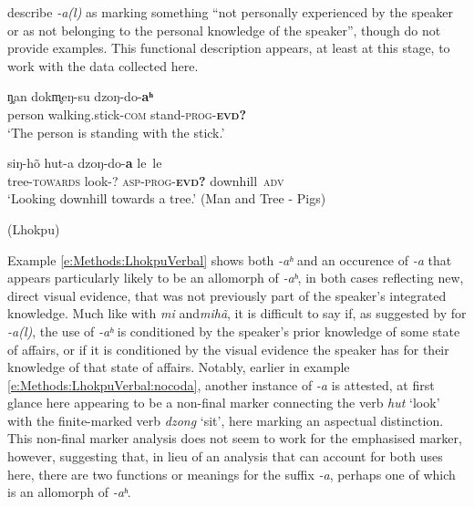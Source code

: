 \cite[20-21]{Grollmann2018} describe \textit{-a(l)} as marking something ``not personally experienced by the speaker or as not belonging to the personal knowledge of the speaker'', though do not provide examples. This functional description appears, at least at this stage, to work with the data collected here.

\begin{exe}
\ex\label{e:Methods:LhokpuVerbal}
\begin{xlist}
\ex \label{e:Methods:LhokpuVerbal:coda}
\gll ŋ̥an dokm̥eŋ-su dzoŋ-do-\textbf{aʰ} \\
person walking.stick-\textsc{com} stand-\textsc{prog-\textbf{evd?}} \\
\glt `The person is standing with the stick.'

\ex \label{e:Methods:LhokpuVerbal:nocoda}
\gll siŋ-hõ hut-a dzoŋ-do-\textbf{a} le~le \\
tree-\textsc{towards} look-? \textsc{asp-prog-\textbf{evd?}} downhill~\textsc{adv} \\
\glt `Looking downhill towards a tree.'
(Man and Tree - Pigs)
\end{xlist}
(Lhokpu)
\end{exe}

Example \ref{e:Methods:LhokpuVerbal} shows both \textit{-aʰ} and an occurence of \textit{-a} that appears particularly likely to be an allomorph of \textit{-aʰ}, in both cases reflecting new, direct visual evidence, that was not previously part of the speaker's integrated knowledge. Much like with \textit{mi} and\textit{mihã}, it is difficult to say if, as suggested by  for \textit{-a(l)}, the use of \textit{-aʰ} is conditioned by the speaker's prior knowledge of some state of affairs, or if it is conditioned by the visual evidence the speaker has for their knowledge of that state of affairs. Notably, earlier in example \ref{e:Methods:LhokpuVerbal:nocoda}, another instance of \textit{-a} is attested, at first glance here appearing to be a non-final marker connecting the verb \textit{hut} `look' with the finite-marked verb \textit{dzong} `sit', here marking an aspectual distinction. This non-final marker analysis does not seem to work for the emphasised marker, however, suggesting that, in lieu of an analysis that can account for both uses here, there are two functions or meanings for the suffix \textit{-a}, perhaps one of which is an allomorph of \textit{-aʰ}.

